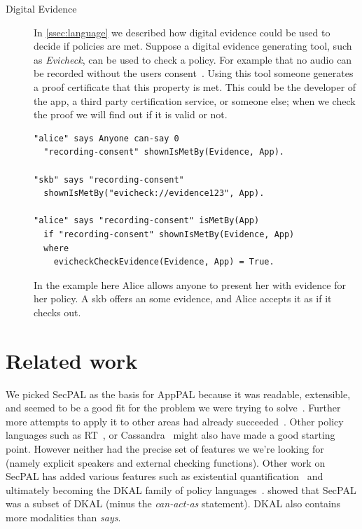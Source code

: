 \documentclass[a4paper]{scrartcl}
\newcommand{\comment}[1]{}%
\begin{document}
\begin{description}
  \item[Digital Evidence]
    In \autoref{ssec:language} we described how digital evidence could be used to decide if policies are met.
    Suppose a digital evidence generating tool, such as \emph{Evicheck}, can be used to check a policy.
    For example that no audio can be recorded without the users consent~\citep{Seghir:2014uq}.
    Using this tool someone generates a proof certificate that this property is met.
    This could be the developer of the app, a third party certification service, or someone else;
      when we check the proof we will find out if it is valid or not.
    \begin{lstlisting}
"alice" says Anyone can-say 0 
  "recording-consent" shownIsMetBy(Evidence, App).

"skb" says "recording-consent" 
  shownIsMetBy("evicheck://evidence123", App).

"alice" says "recording-consent" isMetBy(App)
  if "recording-consent" shownIsMetBy(Evidence, App)
  where
    evicheckCheckEvidence(Evidence, App) = True. 
    \end{lstlisting}
    In the example here Alice allows anyone to present her with evidence for her policy.
    A \ac{skb} offers an some evidence, and Alice accepts it as if it checks out.
\end{description}

\section{Related work \comment{1--2 pages}}

We picked SecPAL as the basis for AppPAL because it was readable, extensible, and seemed to be a good fit for the problem we were trying to solve~\citep{Hallett:2014un}.
Further more attempts to apply it to other areas had already succeeded~\citep{Aziz:2011vt,Humphrey:2007wc}.
Other policy languages such as RT~\citep{Li:2003ua}, or Cassandra~\citep{Becker:2004il} might also have made a good starting point.
However neither had the precise set of features we we're looking for (namely explicit speakers and external checking functions).
Other work on SecPAL has added various features such as existential quantification~\citep{Becker:2009vt} and ultimately becoming the DKAL family of policy languages~\citep{Gurevich:2008fz,Gurevich:Qo5E3M3}.
\citeauthor{Gurevich:2008fz} showed that SecPAL was a subset of DKAL (minus the \emph{can-act-as} statement).
DKAL also contains more modalities than \emph{says}.
\end{document}
